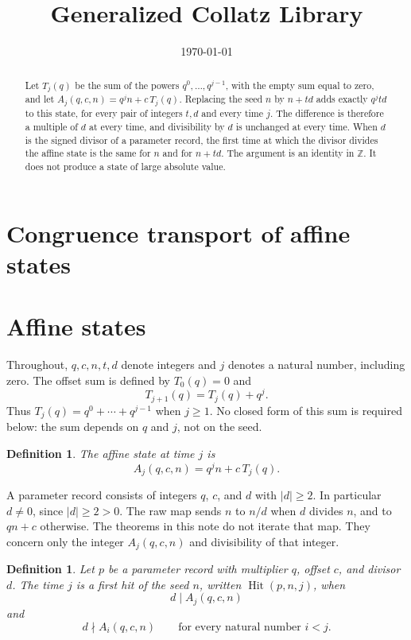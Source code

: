 \documentclass[11pt,letterpaper]{article}
\title{Generalized Collatz Library}
\author{}
\date{\today}
\newcommand{\Z}{\mathbb{Z}}
\newtheorem{definition}[theorem]{Definition}
\begin{document}
\maketitle
\section*{Congruence transport of affine states}

\begin{abstract}
Let \(T_j(q)\) be the sum of the powers \(q^0,\dots,q^{j-1}\), with the empty
sum equal to zero, and let
\(A_j(q,c,n)=q^j n+c\,T_j(q)\). Replacing the seed \(n\) by \(n+td\) adds
exactly \(q^j td\) to this state, for every pair of integers \(t,d\) and every
time \(j\). The difference is therefore a multiple of \(d\) at every time, and
divisibility by \(d\) is unchanged at every time. When \(d\) is the signed
divisor of a parameter record, the first time at which the divisor divides the
affine state is the same for \(n\) and for \(n+td\). The argument is an
identity in \(\Z\). It does not produce a state of large absolute value.
\end{abstract}

\section{Affine states}

Throughout, \(q,c,n,t,d\) denote integers and \(j\) denotes a natural number,
including zero. The offset sum is defined by \(T_0(q)=0\) and
\[
T_{j+1}(q)=T_j(q)+q^j.
\]
Thus \(T_j(q)=q^0+\cdots+q^{j-1}\) when \(j\ge 1\). No closed form of this sum
is required below: the sum depends on \(q\) and \(j\), not on the seed.

\begin{definition}
\label{def:affine-state}
The \emph{affine state} at time \(j\) is
\[
A_j(q,c,n)=q^j n+c\,T_j(q).
\]
\end{definition}

A parameter record consists of integers \(q\), \(c\), and \(d\) with
\(|d|\ge 2\). In particular \(d\neq 0\), since \(|d|\ge 2>0\). The raw map
sends \(n\) to \(n/d\) when \(d\) divides \(n\), and to \(qn+c\) otherwise.
The theorems in this note do not iterate that map. They concern only the
integer \(A_j(q,c,n)\) and divisibility of that integer.

\begin{definition}
\label{def:first-hit}
Let \(p\) be a parameter record with multiplier \(q\), offset \(c\), and
divisor \(d\). The time \(j\) is a \emph{first hit} of the seed \(n\), written
\(\operatorname{Hit}(p,n,j)\), when
\[
d\mid A_j(q,c,n)
\]
and
\[
d\nmid A_i(q,c,n)\qquad\text{for every natural number \(i<j\).}
\]
\end{definition}
\end{document}
